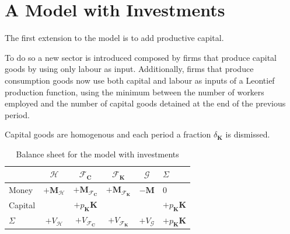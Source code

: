 \chapter{A Model with Investments}
The first extension to the model is to add productive capital.

To do so a new sector is introduced composed by firms that produce capital goods by using only labour as input.
Additionally, firms that produce consumption goods now use both capital and labour as inputs of a Leontief production function, using the minimum between the number of workers employed and the number of capital goods detained at the end of the previous period.

Capital goods are homogenous and each period a fraction $\delta_\mathbf{K}$ is dismissed.

\begin{table}
    \centering
    \begin{tabular}{l|cccc|l}
                 & $\mathcal{H}$             & $\mathcal{F}_\mathbf{C}$               & $\mathcal{F}_\mathbf{K}$               & $\mathcal{G}$    & $\Sigma$                   \\
        \midrule
        Money    & $+\mathbf{M}_\mathcal{H}$ & $+\mathbf{M}_{\mathcal{F}_\mathbf{C}}$ & $+\mathbf{M}_{\mathcal{F}_\mathbf{K}}$ & $-\mathbf{M}$    & 0                          \\
        \midrule
        Capital  &                           & $+p_\mathbf{K} \mathbf{K}$             &                                        &                  & $+p_\mathbf{K} \mathbf{K}$ \\
        \midrule
        $\Sigma$ & $+V_\mathcal{H}$          & $+V_{\mathcal{F}_\mathbf{C}}$          & $+V_{\mathcal{F}_\mathbf{K}}$          & $+V_\mathcal{G}$ & $+p_\mathbf{K} \mathbf{K}$ \\
    \end{tabular}
    \caption{Balance sheet for the model with investments}
\end{table}

